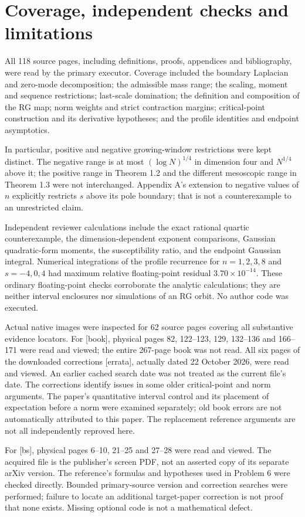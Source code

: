 \documentclass[10pt]{article}
\begin{document}
\section*{Coverage, independent checks and limitations}
All 118 source pages, including definitions, proofs, appendices and bibliography, were read by the primary executor. Coverage included the boundary Laplacian and zero-mode decomposition; the admissible mass range; the scaling, moment and sequence restrictions; last-scale domination; the definition and composition of the RG map; norm weights and strict contraction margins; critical-point construction and its derivative hypotheses; and the profile identities and endpoint asymptotics.\par
In particular, positive and negative growing-window restrictions were kept distinct. The negative range is at most \((\log N)^{1/4}\) in dimension four and \(N^{1/4}\) above it; the positive range in Theorem 1.2 and the different mesoscopic range in Theorem 1.3 were not interchanged. Appendix A’s extension to negative values of \(n\) explicitly restricts \(s\) above its pole boundary; that is not a counterexample to an unrestricted claim.\par
Independent reviewer calculations include the exact rational quartic counterexample, the dimension-dependent exponent comparisons, Gaussian quadratic-form moments, the susceptibility ratio, and the endpoint Gaussian integral. Numerical integrations of the profile recurrence for \(n=1,2,3,8\) and \(s=-4,0,4\) had maximum relative floating-point residual \(3.70\times10^{-14}\). These ordinary floating-point checks corroborate the analytic calculations; they are neither interval enclosures nor simulations of an RG orbit. No author code was executed.\par
Actual native images were inspected for 62 source pages covering all substantive evidence locators. For [book], physical pages 82, 122–123, 129, 132–136 and 166–171 were read and viewed; the entire 267-page book was not read. All six pages of the downloaded corrections [errata], actually dated 22 October 2026, were read and viewed. An earlier cached search date was not treated as the current file’s date. The corrections identify issues in some older critical-point and norm arguments. The paper’s quantitative interval control and its placement of expectation before a norm were examined separately; old book errors are not automatically attributed to this paper. The replacement reference arguments are not all independently reproved here.\par
For [bs], physical pages 6–10, 21–25 and 27–28 were read and viewed. The acquired file is the publisher’s screen PDF, not an asserted copy of its separate arXiv version. The reference’s formulas and hypotheses used in Problem 6 were checked directly. Bounded primary-source version and correction searches were performed; failure to locate an additional target-paper correction is not proof that none exists. Missing optional code is not a mathematical defect.\par
\end{document}
